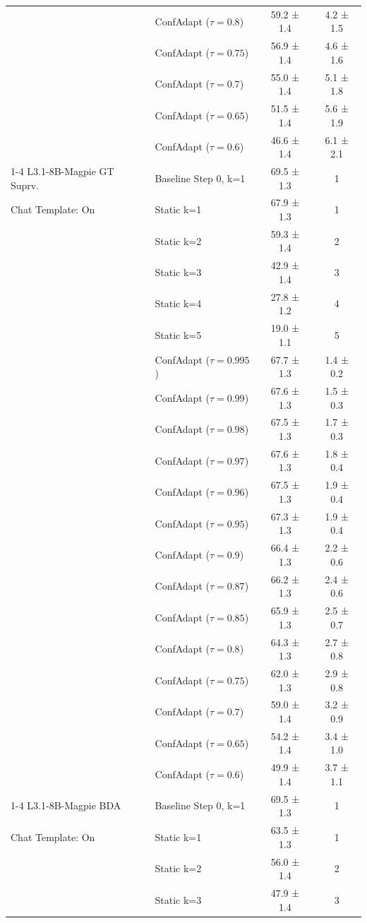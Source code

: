 \documentclass{article}
\theoremstyle{plain}
\theoremstyle{definition}
\theoremstyle{remark}
\begin{document}
\begin{table}[h!]
\begin{tabular}{llcc}
 & ConfAdapt ($\tau=0.8$) & 59.2 ± 1.4 & 4.2 ± 1.5 \\
 & ConfAdapt ($\tau=0.75$) & 56.9 ± 1.4 & 4.6 ± 1.6 \\
 & ConfAdapt ($\tau=0.7$) & 55.0 ± 1.4 & 5.1 ± 1.8 \\
 & ConfAdapt ($\tau=0.65$) & 51.5 ± 1.4 & 5.6 ± 1.9 \\
 & ConfAdapt ($\tau=0.6$) & 46.6 ± 1.4 & 6.1 ± 2.1 \\
\cline{1-4}
L3.1-8B-Magpie GT Suprv. & Baseline Step 0, k=1 & 69.5 ± 1.3 & 1 \\
 Chat Template: On & Static k=1 & 67.9 ± 1.3 & 1 \\
 & Static k=2 & 59.3 ± 1.4 & 2 \\
 & Static k=3 & 42.9 ± 1.4 & 3 \\
 & Static k=4 & 27.8 ± 1.2 & 4 \\
 & Static k=5 & 19.0 ± 1.1 & 5 \\
 & ConfAdapt ($\tau=0.995$) & 67.7 ± 1.3 & 1.4 ± 0.2 \\
 & ConfAdapt ($\tau=0.99$) & 67.6 ± 1.3 & 1.5 ± 0.3 \\
 & ConfAdapt ($\tau=0.98$) & 67.5 ± 1.3 & 1.7 ± 0.3 \\
 & ConfAdapt ($\tau=0.97$) & 67.6 ± 1.3 & 1.8 ± 0.4 \\
 & ConfAdapt ($\tau=0.96$) & 67.5 ± 1.3 & 1.9 ± 0.4 \\
 & ConfAdapt ($\tau=0.95$) & 67.3 ± 1.3 & 1.9 ± 0.4 \\
 & ConfAdapt ($\tau=0.9$) & 66.4 ± 1.3 & 2.2 ± 0.6 \\
 & ConfAdapt ($\tau=0.87$) & 66.2 ± 1.3 & 2.4 ± 0.6 \\
 & ConfAdapt ($\tau=0.85$) & 65.9 ± 1.3 & 2.5 ± 0.7 \\
 & ConfAdapt ($\tau=0.8$) & 64.3 ± 1.3 & 2.7 ± 0.8 \\
 & ConfAdapt ($\tau=0.75$) & 62.0 ± 1.3 & 2.9 ± 0.8 \\
 & ConfAdapt ($\tau=0.7$) & 59.0 ± 1.4 & 3.2 ± 0.9 \\
 & ConfAdapt ($\tau=0.65$) & 54.2 ± 1.4 & 3.4 ± 1.0 \\
 & ConfAdapt ($\tau=0.6$) & 49.9 ± 1.4 & 3.7 ± 1.1 \\
\cline{1-4}
L3.1-8B-Magpie BDA & Baseline Step 0, k=1 & 69.5 ± 1.3 & 1 \\
 Chat Template: On & Static k=1 & 63.5 ± 1.3 & 1 \\
 & Static k=2 & 56.0 ± 1.4 & 2 \\
 & Static k=3 & 47.9 ± 1.4 & 3 \\

\end{tabular}
\end{table}
\end{document}
